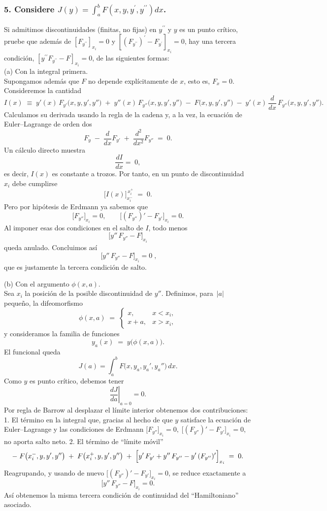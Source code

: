\documentclass{article}
\theoremstyle{nonumberplain}
\begin{document}
\subsubsection*{5. Considere \( J(y)=\int_{a}^{b} F\left(x, y, y^{\prime}, y^{\prime \prime}\right) d x \).} Si admitimos discontinuidades (finitas, no fijas) en \( y^{\prime \prime} \) y \( y \) es un punto crítico, pruebe que además de \( \left[F_{y^{\prime \prime}}\right]_{x_{i}}=0 \) y \( \left[\left(F_{y^{\prime \prime}}\right)^{\prime}-F_{y^{\prime}}\right]_{x_{i}}=0 \), hay una tercera condición, \( \left[y^{\prime \prime} F_{y^{\prime \prime}}-F\right]_{x_{i}}=0 \), de las siguientes formas: \\
(a) Con la integral primera. \\

Supongamos además que \(F\) no depende explícitamente de \(x\), esto es, \(F_x=0\). Consideremos la cantidad
\[
I(x)\;\equiv\;y'(x)\,F_{y'}\bigl(x,y,y',y''\bigr)
\;+\;y''(x)\,F_{y''}\bigl(x,y,y',y''\bigr)
\;-\;F\bigl(x,y,y',y''\bigr)
\;-\;y'(x)\,\frac{d}{dx}\,F_{y''}\bigl(x,y,y',y''\bigr).
\]
Calculamos su derivada usando la regla de la cadena y, a la vez, la ecuación de Euler–Lagrange de orden dos
\[
F_y \;-\;\frac{d}{dx}F_{y'}\;+\;\frac{d^2}{dx^2}F_{y''}\;=\;0.
\]
Un cálculo directo muestra
\[
\frac{dI}{dx}
=\;0,
\]
es decir, \(I(x)\) es constante a trozos.  Por tanto, en un punto de discontinuidad \(x_i\) debe cumplirse
\[
\bigl[I(x)\bigr]_{x_i^-}^{\,x_i^+}
\;=\;0.
\]
Pero por hipótesis de Erdmann ya sabemos que
\[
\bigl[F_{y''}\bigr]_{x_i}=0,
\qquad
\bigl[(F_{y''})'-F_{y'}\bigr]_{x_i}=0.
\]
Al imponer esas dos condiciones en el salto de \(I\), todo menos
\[
\bigl[y''\,F_{y''}-F\bigr]_{x_i}
\]
queda anulado.  Concluimos así
\[
\boxed{\;\bigl[y''\,F_{y''}-F\bigr]_{x_i}=0\;},
\]
que es justamente la tercera condición de salto.


(b) Con el argumento \( \phi(x, a) \). \\

Sea \(x_i\) la posición de la posible discontinuidad de \(y''\). Definimos, para \(\,|a|\) pequeño, la difeomorfismo
\[
\phi(x,a)\;=\;
\begin{cases}
x, & x<x_i,\\
x+a, & x>x_i,
\end{cases}
\]
y consideramos la familia de funciones
\[
y_a(x)\;=\;y\bigl(\phi(x,a)\bigr).
\]
El funcional queda
\[
J(a)
=\int_a^b
F\bigl(x,y_a,y_a',y_a''\bigr)\,dx.
\]
Como \(y\) es punto crítico, debemos tener
\[
\left.\frac{dJ}{da}\right|_{a=0}=0.
\]
Por regla de Barrow al desplazar el límite interior obtenemos dos contribuciones:  
 1. El término en la integral que, gracias al hecho de que \(y\) satisface la ecuación de Euler–Lagrange y las condiciones de Erdmann \(\bigl[F_{y''}\bigr]_{x_i}=0,\;\bigl[(F_{y''})'-F_{y'}\bigr]_{x_i}=0\), no aporta salto neto.  
 2. El término de “límite móvil”  
\[
-\;F\bigl(x_i^-,y,y',y''\bigr)
\;+\;F\bigl(x_i^+,y,y',y''\bigr)
\;+\;\Bigl[y'\,F_{y'}+y''\,F_{y''}-y'\,(F_{y''})'\Bigr]_{x_i}\;=\;0.
\]
Reagrupando, y usando de nuevo \(\bigl[(F_{y''})'-F_{y'}\bigr]_{x_i}=0\), se reduce exactamente a
\[
\bigl[y''\,F_{y''}-F\bigr]_{x_i}=0.
\]
Así obtenemos la misma tercera condición de continuidad del “Hamiltoniano” asociado.
\end{document}
